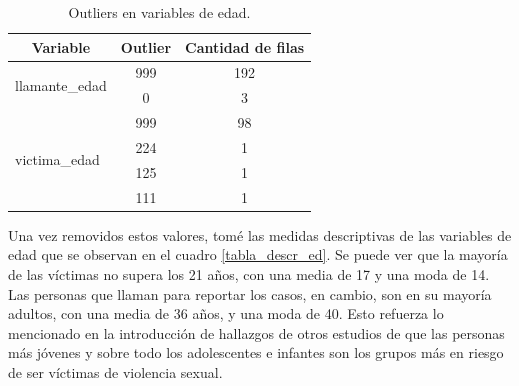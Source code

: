 \documentclass[10 pt]{article}
\begin{document}
\begin{table}[H]
    \centering
    \small
    \caption{Outliers en variables de edad.}
    \label{tabla_out}
    \begin{tabular}{lcc}
    \hline
    \multicolumn{1}{c}{\textbf{Variable}} & \textbf{Outlier} & \textbf{Cantidad de filas} \\ \hline
    \multirow{2}{*}{llamante\_edad}       & 999              & 192                        \\
                                          & 0                & 3                          \\ \hline
    \multirow{4}{*}{victima\_edad}        & 999              & 98                         \\
                                          & 224              & 1                          \\
                                          & 125              & 1                          \\
                                          & 111              & 1                          \\ \hline
    \end{tabular}
    \end{table}


Una vez removidos estos valores, tomé las medidas descriptivas de las variables de edad que se observan en el cuadro \ref{tabla_descr_ed}. Se puede ver que la mayoría de las víctimas no supera los 21 años, con una media de 17 y una moda de 14. Las personas que llaman para reportar los casos, en cambio, son en su mayoría adultos, con una media de 36 años, y una moda de 40. Esto refuerza lo mencionado en la introducción de hallazgos de otros estudios de que las personas más jóvenes y sobre todo los adolescentes e infantes son los grupos más en riesgo de ser víctimas de violencia sexual. 
\end{document}
